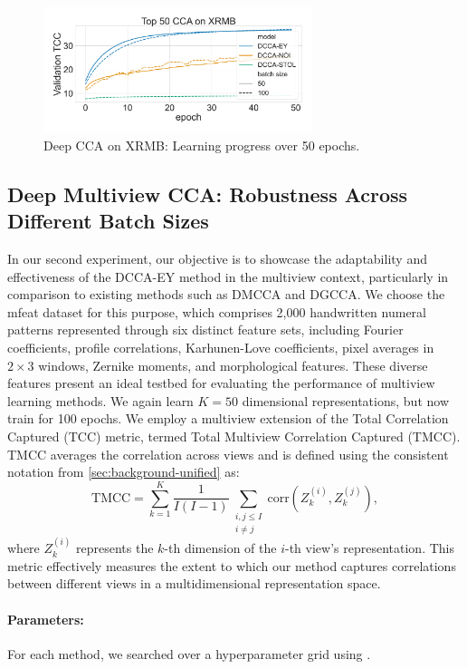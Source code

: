 \begin{figure}
    \centering
    \includegraphics[width=0.7\textwidth]{figures/DCCA/XRMB_allbatchsizes_pcc}
    \caption{Deep CCA on XRMB: Learning progress over 50 epochs.}
    \label{fig:lr_xrmb}
\end{figure}

\subsection{Deep Multiview CCA: Robustness Across Different Batch Sizes}
In our second experiment, our objective is to showcase the adaptability and effectiveness of the DCCA-EY method in the multiview context, particularly in comparison to existing methods such as DMCCA and DGCCA. We choose the mfeat dataset for this purpose, which comprises 2,000 handwritten numeral patterns represented through six distinct feature sets, including Fourier coefficients, profile correlations, Karhunen-Love coefficients, pixel averages in \(2 \times 3\) windows, Zernike moments, and morphological features. These diverse features present an ideal testbed for evaluating the performance of multiview learning methods.
We again learn $K=50$ dimensional representations, but now train for 100 epochs.
We employ a multiview extension of the Total Correlation Captured (TCC) metric, termed Total Multiview Correlation Captured (TMCC). TMCC averages the correlation across views and is defined using the consistent notation from \cref{sec:background-unified} as:
\[
    \text{TMCC} = \sum_{k=1}^{K} \frac{1}{I(I-1)} \sum_{\substack{i,j \leq I \\ i \neq j}} \text{corr}(Z_k^{(i)}, Z_k^{(j)}),
\]
where \( Z_k^{(i)} \) represents the \( k \)-th dimension of the \( i \)-th view's representation. This metric effectively measures the extent to which our method captures correlations between different views in a multidimensional representation space.

\paragraph{Parameters:} For each method, we searched over a hyperparameter grid using \citet{wandb}.


